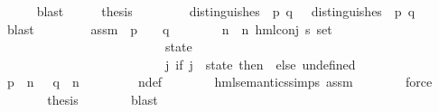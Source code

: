 \begin{isabellebody}
\ \ \ \ \isamarkupfalse%
\ blast\isanewline
\ \ \isamarkupfalse%
\ \isamarkupfalse%
\ {\isacharquery}{\kern0pt}thesis\isanewline
\ \ \isamarkupfalse%
\isanewline
\ \ \ \ \isamarkupfalse%
\ {\isachardoublequoteopen}distinguishes\ {\isasymphi}\ p\ q\ {\isasymLongrightarrow}\ {\isasymexists}{\isasymphi}{\isachardot}{\kern0pt}\ distinguishes\ {\isasymphi}\ p\ q{\isachardoublequoteclose}\ \isamarkupfalse%
\ blast\isanewline
\ \ \isamarkupfalse%
\isanewline
\ \ \ \ \isamarkupfalse%
\ assm{\isacharcolon}{\kern0pt}\ {\isachardoublequoteopen}{\isasymnot}\ p\ {\isasymTurnstile}\ {\isasymphi}\ {\isasymand}\ q\ {\isasymTurnstile}\ {\isasymphi}{\isachardoublequoteclose}\isanewline
\ \ \ \ \isamarkupfalse%
\ n{\isasymphi}\ \ {\isachardoublequoteopen}n{\isasymphi}\ {\isasymequiv}{\isacharparenleft}{\kern0pt}hml{\isacharunderscore}{\kern0pt}conj\ {\isacharparenleft}{\kern0pt}{\isacharbraceleft}{\kern0pt}{\isacharbraceright}{\kern0pt}{\isacharcolon}{\kern0pt}{\isacharcolon}{\kern0pt}{\isacharprime}{\kern0pt}s\ set{\isacharparenright}{\kern0pt}\ \isanewline
\ \ \ \ \ \ \ \ \ \ \ \ \ \ \ \ \ \ \ \ \ \ \ \ \ \ {\isacharbraceleft}{\kern0pt}state{\isacharbraceright}{\kern0pt}\ \isanewline
\ \ \ \ \ \ \ \ \ \ \ \ \ \ \ \ \ \ \ \ \ \ \ \ \ \ {\isacharparenleft}{\kern0pt}{\isasymlambda}j{\isachardot}{\kern0pt}\ if\ j\ {\isacharequal}{\kern0pt}\ state\ then\ {\isasymphi}\ else\ undefined{\isacharparenright}{\kern0pt}{\isacharparenright}{\kern0pt}{\isachardoublequoteclose}\isanewline
\ \ \ \ \isamarkupfalse%
\ {\isachardoublequoteopen}p\ {\isasymTurnstile}\ n{\isasymphi}\ {\isasymand}\ {\isasymnot}\ q\ {\isasymTurnstile}\ n{\isasymphi}{\isachardoublequoteclose}\ \isanewline
\ \ \ \ \ \ \isamarkupfalse%
\ n{\isasymphi}{\isacharunderscore}{\kern0pt}def\isanewline
\ \ \ \ \ \ \isamarkupfalse%
\ hml{\isacharunderscore}{\kern0pt}semantics{\isachardot}{\kern0pt}simps\ assm\isanewline
\ \ \ \ \ \ \isamarkupfalse%
\ force\isanewline
\ \ \ \ \isamarkupfalse%
\ \isamarkupfalse%
\ {\isacharquery}{\kern0pt}thesis\isanewline
\ \ \ \ \ \ \isamarkupfalse%
\ blast\isanewline
\ \ \isamarkupfalse%
\isanewline
{}\isamarkupfalse%
%
\endisatagproof
{\isafoldproof}%
%
\isadelimproof
\isanewline
%
\endisadelimproof
\isanewline
{}\isamarkupfalse%
%
\begin{isamarkuptext}%

\end{isamarkuptext}
\end{isabellebody}
